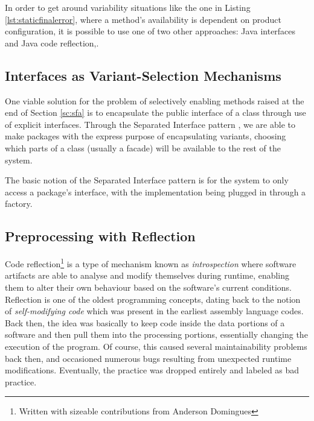 In order to get around \gls{variability} situations like the one in Listing \ref{lst:staticfinalerror}, where a method's availability is dependent on product configuration, it is possible to use one of two other approaches: Java interfaces and Java code reflection,.


\subsection{Interfaces as Variant-Selection Mechanisms}
\label{sc:interfaces}

One viable solution for the problem of selectively enabling methods raised at the end of Section \ref{sc:sfa} is to encapsulate the public interface of a class through use of explicit interfaces. Through the Separated Interface pattern \cite{FOWLER:2002}, we are able to make packages with the express purpose of encapsulating \gls{variant}s, choosing which parts of a class (usually a facade) will be available to the rest of the system.

The basic notion of the Separated Interface pattern is for the system to only access a package's interface, with the implementation being plugged in through a factory.


\subsection{Preprocessing with Reflection}
\label{sc:reflection}

Code reflection\footnote{Written with sizeable contributions from Anderson Domingues} is a type of mechanism known as \emph{introspection} where software artifacts are able to analyse and modify themselves during runtime, enabling them to alter their own behaviour based on the software's current conditions. Reflection is one of the oldest programming concepts, dating back to the notion of \emph{self-modifying code} which was present in the earliest assembly language codes. Back then, the idea was basically to keep code inside the data portions of a software and then pull them into the processing portions, essentially changing the execution of the program. Of course, this caused several maintainability problems back then, and occasioned numerous bugs resulting from unexpected runtime modifications. Eventually, the practice was dropped entirely and labeled as bad practice.

